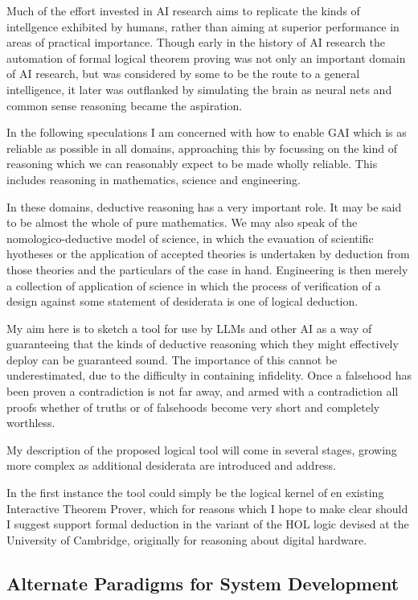 \documentclass[10pt,titlepage]{book}
\begin{document}
Much of the effort invested in AI research aims to replicate the kinds of intellgence exhibited by humans, rather than aiming at superior performance in areas of practical importance.
Though early in the history of AI research the automation of formal logical theorem proving was not only an important domain of AI research, but was considered by some to be the route to a general intelligence, it later was outflanked by simulating the brain as neural nets and common sense reasoning became the aspiration.

In the following speculations I am concerned with how to enable GAI which is as reliable as possible in all domains, approaching this by focussing on the kind of reasoning which we can reasonably expect to be made wholly reliable.
This includes reasoning in mathematics, science and engineering.

In these domains, deductive reasoning has a very important role.
It may be said to be almost the whole of pure mathematics.
We may also speak of the nomologico-deductive model of science, in which the evauation of scientific hyotheses or the application of accepted theories is undertaken by deduction from those theories and the particulars of the case in hand.
Engineering is then merely a collection of application of science in which the process of verification of a design against some statement of desiderata is one of logical deduction.


My aim here is to sketch a tool for use by LLMs and other AI as a way of guaranteeing that the kinds of deductive reasoning which they might effectively deploy can be guaranteed sound.
The importance of this cannot be underestimated, due to the difficulty in containing infidelity.
Once a falsehood has been proven a contradiction is not far away, and armed with a contradiction all proofs whether of truths or of falsehoods become very short and completely worthless.

My description of the proposed logical tool will come in several stages, growing more complex as additional desiderata are introduced and address.

In the first instance the tool could simply be the logical kernel of en existing Interactive Theorem Prover, which for reasons which I hope to make clear should I suggest support formal deduction in the variant of the HOL logic devised at the University of Cambridge, originally for reasoning about digital hardware.


\subsection{Alternate Paradigms for System Development}
\end{document}
